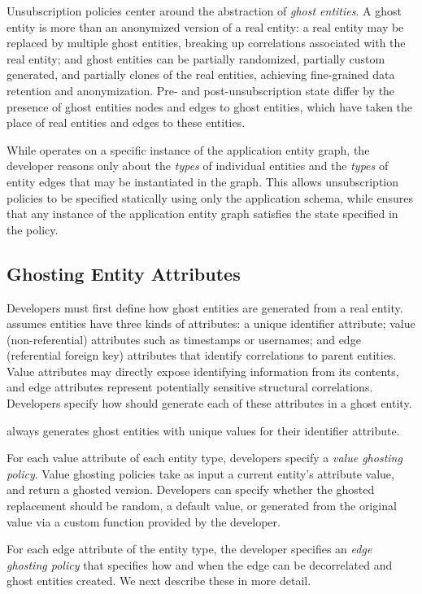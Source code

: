 Unsubscription policies center around the abstraction of \emph{ghost entities}. A ghost entity is
more than an anonymized version of a real entity: a real entity may be replaced by multiple ghost
entities, breaking up correlations associated with the real entity; and ghost entities can be partially
randomized, partially custom generated, and partially clones of the real entities, achieving
fine-grained data retention and anonymization. Pre- and post-unsubscription state differ by the
presence of ghost entities nodes and edges to ghost entities, which have taken the place of real
entities and edges to these entities.

While \sys operates on a specific instance of the application entity graph, the developer reasons
only about the \emph{types} of individual entities and the \emph{types} of entity edges that may be
instantiated in the graph. This allows unsubscription policies to be specified statically using only
the application schema, while \sys ensures that any instance of the application entity graph
satisfies the state specified in the policy.

\subsection{Ghosting Entity Attributes}
Developers must first define how ghost entities are generated from a real entity.
\sys assumes entities have three kinds of attributes: a unique identifier attribute; 
value (non-referential) attributes such as timestamps or usernames; and 
edge (referential foreign key) attributes that identify correlations to parent entities. 
Value attributes may directly expose identifying information from its
contents, and edge attributes represent potentially sensitive structural correlations. 
Developers specify how \sys should generate each of these attributes in a ghost entity.

\sys always generates ghost entities with unique values for their identifier attribute.

For each value attribute of each entity type, developers specify a \emph{value ghosting policy}.
Value ghosting policies take as input a current entity's attribute value, and return a ghosted
version. Developers can specify whether the ghosted replacement should be random, a default value,
or generated from the original value via a custom function provided by the developer. 

For each edge attribute of the entity type, the developer specifies an \emph{edge ghosting policy}
that specifies how and when the edge can be decorrelated and ghost entities created. We next
describe these in more detail.

